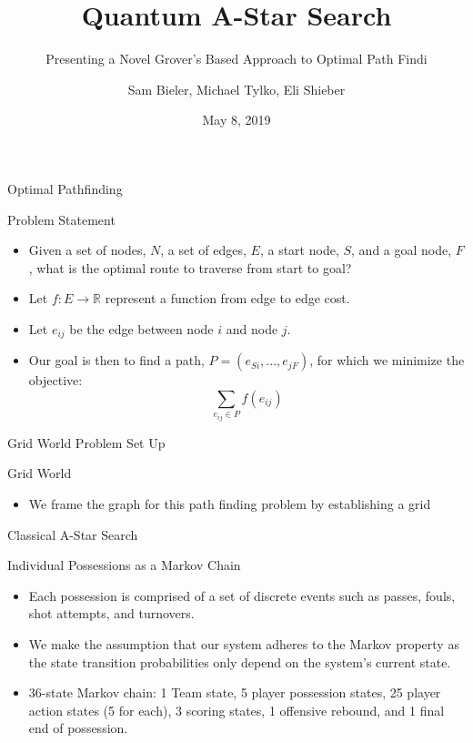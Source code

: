 \documentclass{beamer}
\title{Quantum A-Star Search}
\subtitle{Presenting a Novel Grover's Based Approach to Optimal Path Findi}
\author{Sam Bieler, Michael Tylko, Eli Shieber}
\institute{ES 170 | Professor Pri}
\date{May 8, 2019}
\begin{document}
\begin{frame}
  \titlepage
\end{frame}


\begin{frame}{Optimal Pathfinding}

\begin{block}{Problem Statement}
\begin{itemize}
  \item Given a set of nodes, $N$, a set of edges, $E$, a start node, $S$, and a goal node, $F$, what is the optimal route to traverse from start to goal?
  \item Let $f: E \rightarrow \mathbb{R}$ represent a function from edge to edge cost.
  \item Let $e_{ij}$ be the edge between node $i$ and node $j$.
  \item Our goal is then to find a path, $P = (e_{Si},...,e_{jF})$, for which we minimize the objective:
  $$ \sum_{e_{ij} \in P} f(e_{ij}) $$
\end{itemize}
\end{block}
\end{frame}

\begin{frame}{Grid World Problem Set Up}

\begin{block}{Grid World}
\begin{itemize}
  \item We frame the graph for this path finding problem by establishing a grid 
\end{itemize}
\end{block}
\end{frame}

\begin{frame}{Classical A-Star Search}

\begin{block}{Individual Possessions as a Markov Chain}
\begin{itemize}
  \item Each possession is comprised of a set of discrete events such as passes, fouls, shot attempts, and turnovers.
  \item We make the assumption that our  system adheres to the Markov property as the state transition probabilities only depend on the system’s current state.
  \item 36-state Markov chain: 1 Team state, 5 player possession states, 25 player action states (5 for each), 3 scoring states, 1 offensive rebound, and 1 final end of possession.
\end{itemize}
\end{block}
\end{frame}
\end{document}
